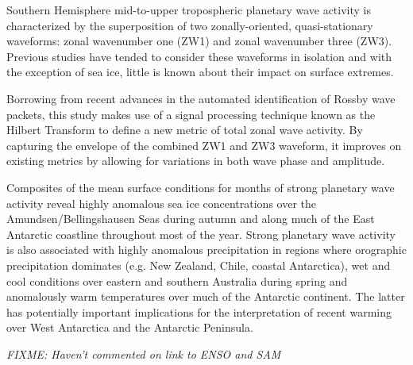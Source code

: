 Southern Hemisphere mid-to-upper tropospheric planetary wave activity is characterized by the superposition of two zonally-oriented, quasi-stationary waveforms: zonal wavenumber one (ZW1) and zonal wavenumber three (ZW3). Previous studies have tended to consider these waveforms in isolation and with the exception of sea ice, little is known about their impact on surface extremes. 

Borrowing from recent advances in the automated identification of Rossby wave packets, this study makes use of a signal processing technique known as the Hilbert Transform to define a new metric of total zonal wave activity. By capturing the envelope of the combined ZW1 and ZW3 waveform, it improves on existing metrics by allowing for variations in both wave phase and amplitude.

Composites of the mean surface conditions for months of strong planetary wave activity reveal highly anomalous sea ice concentrations over the Amundsen/Bellingshausen Seas during autumn and along much of the East Antarctic coastline throughout most of the year. Strong planetary wave activity is also associated with highly anomalous precipitation in regions where orographic precipitation dominates (e.g. New Zealand, Chile, coastal Antarctica), wet and cool conditions over eastern and southern Australia during spring and anomalously warm temperatures over much of the Antarctic continent. The latter has potentially important implications for the interpretation of recent warming over West Antarctica and the Antarctic Peninsula.

\textit{FIXME: Haven't commented on link to ENSO and SAM}
